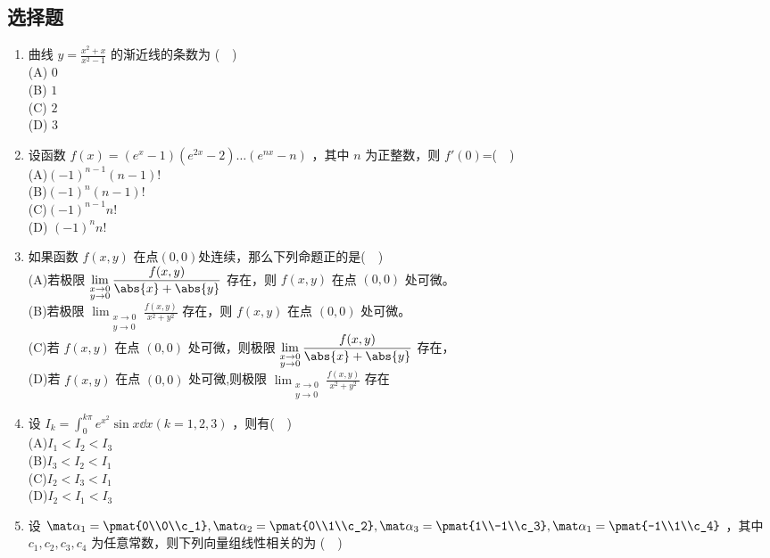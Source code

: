 \subsection{选择题}
\begin{enumerate}
\item 曲线 $\displaystyle y=\frac{x^2+x}{x^2-1}$ 的渐近线的条数为 ($\quad$)\\
(A) $0$\\
(B) $1$\\
(C) $2$\\
(D) $3$
\item 设函数 $f(x)=(e^x-1)(e^{2x}-2)\dots(e^{nx}-n)$ ，其中 $n$ 为正整数，则 $f'(0)$=($\quad$)\\
(A)$(-1)^{n-1}(n-1)!$\\
(B)$(-1)^n(n-1)!$\\
(C)$(-1)^{n-1}n!$\\
(D) $(-1)^n n!$
\item 如果函数 $f(x,y)$ 在点$ (0,0) $处连续，那么下列命题正的是($\quad$)\\
(A)若极限 $\displaystyle \lim_{\substack {x\to0 \\ y\to 0}}\frac{f(x,y)}{\abs{x}+\abs{y}}$ 存在，则 $f(x,y)$ 在点  $(0,0)$ 处可微。\\
(B)若极限 $\displaystyle \lim_{\substack {x\to0 \\ y\to 0}}\frac{f(x,y)}{x^2+y^2}$ 存在，则 $f(x,y)$ 在点  $(0,0)$ 处可微。\\
(C)若 $f(x,y)$ 在点  $(0,0)$ 处可微，则极限 $\displaystyle \lim_{\substack {x\to0 \\ y\to 0}}\frac{f(x,y)}{\abs{x}+\abs{y}}$ 存在，\\
(D)若 $f(x,y)$ 在点  $(0,0)$ 处可微,则极限 $\displaystyle \lim_{\substack {x\to0 \\ y\to 0}}\frac{f(x,y)}{x^2+y^2}$ 存在
\item 设 $\displaystyle I_k=\int_{0}^{k\pi} e^{x^2}\sin x\dd{x}(k=1,2,3) $ ，则有($\quad$)\\
(A)$I_1<I_2<I_3$\\
(B)$I_3<I_2<I_1$\\
(C)$I_2<I_3<I_1$\\
(D)$I_2<I_1<I_3$
\item  设 $\mat \alpha_1=\pmat{0\\0\\c_1},\mat \alpha_2=\pmat{0\\1\\c_2},\mat \alpha_3=\pmat{1\\-1\\c_3},\mat \alpha_1=\pmat{-1\\1\\c_4}$ ，其中 $c_1,c_2,c_3,c_4$ 为任意常数，则下列向量组线性相关的为 ($\quad$)\\

\end{enumerate}
